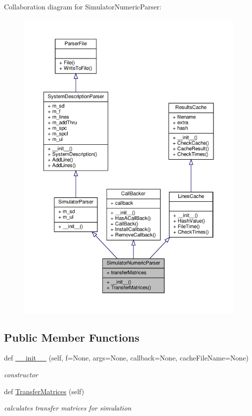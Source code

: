 Collaboration diagram for Simulator\+Numeric\+Parser\+:
\nopagebreak
\begin{figure}[H]
\begin{center}
\leavevmode
\includegraphics[width=350pt]{classSignalIntegrity_1_1Parsers_1_1SimulatorNumericParser_1_1SimulatorNumericParser__coll__graph}
\end{center}
\end{figure}
\subsection*{Public Member Functions}
\begin{DoxyCompactItemize}
\item 
def \hyperlink{classSignalIntegrity_1_1Parsers_1_1SimulatorNumericParser_1_1SimulatorNumericParser_a5ce77900c33ce9b681aebb5c527ab92a}{\+\_\+\+\_\+init\+\_\+\+\_\+} (self, f=None, args=None, callback=None, cache\+File\+Name=None)
\begin{DoxyCompactList}\small\item\em constructor \end{DoxyCompactList}\item 
def \hyperlink{classSignalIntegrity_1_1Parsers_1_1SimulatorNumericParser_1_1SimulatorNumericParser_a836e87421e9e21a6676da06625b644b1}{Transfer\+Matrices} (self)
\begin{DoxyCompactList}\small\item\em calculates transfer matrices for simulation \end{DoxyCompactList}\end{DoxyCompactItemize}


